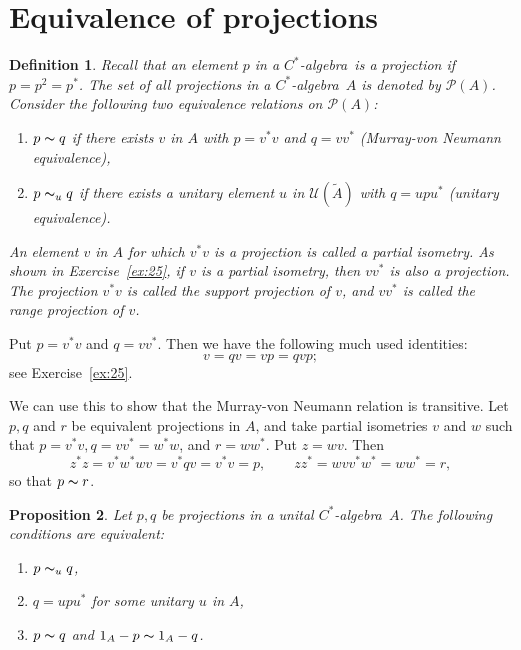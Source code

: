 \documentclass{book}
\newtheorem{definition}{Definition}[section]
\newtheorem{proposition}[definition]{Proposition}
\def\cstar{\(C^*\)-algebra}
\begin{document}
\section{Equivalence of projections}
\begin{definition}
  Recall that an element \(p\) in a \cstar\ is a projection if \(p=p^2=p^*\).
  The set of all projections in a \cstar\ \(A\) is denoted by \(\mathcal{P}(A)\).
  Consider the following two equivalence relations on \(\mathcal{P}(A)\):
  \begin{enumerate}
    \item \(p\thicksim q\) if there exists \(v\) in \(A\) with \(p=v^* v\) and \(q=v v^*\) (\textnormal{Murray-von Neumann equivalence}),
    \item \(p\thicksim_u q\) if there exists a unitary element \(u\) in \(\mathcal{U}(\widetilde{A} )\) with \(q=u p u^*\) (\textnormal{unitary equivalence}).
  \end{enumerate}
  An element \(v\) in \(A\) for which \(v^* v\) is a projection is called a \textnormal{partial isometry}.
  As shown in Exercise~\ref{ex:25}, if \(v\) is a partial isometry, then \(v v^*\) is also a projection.
  The projection \(v^* v\) is called the \textnormal{support projection} of \(v\), and \(v v^*\) is called the \textnormal{range projection} of \(v\).
\end{definition}
Put \(p=v^* v\) and \(q=v v^*\). Then we have the following much used identities:
\begin{equation}\label{eq:23}
  v=qv=vp=qvp;
\end{equation}
see Exercise~\ref{ex:25}.\par
We can use this to show that the Murray-von Neumann relation is transitive.
Let \(p, q\) and \(r\) be equivalent projections in \(A\), and take partial isometries \(v\) and \(w\) such that
\(p=v^* v, q=v v^*=w^* w\), and \(r=w w^*\). Put \(z=wv\). Then
\[
  z^* z=v^* w^* wv=v^* qv=v^* v=p,\qquad z z^*=w v v^* w^*=w w^*=r,
\]
so that \(p\thicksim r\).
\begin{proposition}\label{prop:522}
  Let \(p, q\) be projections in a unital \cstar\ \(A\). The following conditions are equivalent:
  \begin{enumerate}
    \item\label{prop:2221} \(p\thicksim_u q\),
    \item\label{prop:2222} \(q=u p u^*\) for some unitary \(u\) in \(A\),
    \item\label{prop:2223} \(p\thicksim q\) and \(1_A-p\thicksim 1_A -q\). 
  \end{enumerate}
\end{proposition}
\end{document}
